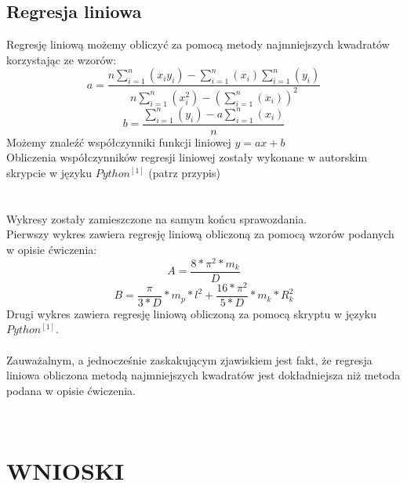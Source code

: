 \documentclass{article}
\begin{document}
{\subsection*{Regresja liniowa}
Regresję liniową możemy obliczyć za pomocą metody najmniejszych kwadratów korzystając ze wzorów:
\[a=\frac{n\sum^n_{i=1}(x_iy_i)-\sum^n_{i=1}(x_i)\sum^n_{i=1}(y_i)}{n\sum^n_{i=1}(x_i^2)-(\sum^n_{i=1}(x_i))^2}\]
\[b = \frac{\sum^n_{i=1}(y_i)-a\sum^n_{i=1}(x_i)}{n}\]
Możemy znaleźć współczynniki funkcji liniowej $y = ax+b$ \\
Obliczenia współczynników regresji liniowej zostały wykonane w autorskim skrypcie w języku $Python^{[1]}$ (patrz przypis) \\
\textbf{} \\
\textbf{} \\
Wykresy zostały zamieszczone na samym końcu sprawozdania.  \\
Pierwszy wykres zawiera regresję liniową obliczoną za pomocą wzorów podanych w opisie ćwiczenia:
\[A = \frac{8*\pi^2*m_k}{D}\]
\[B = \frac{\pi}{3*D}*m_p*l^2+\frac{16*\pi^2}{5*D}*m_k*R_k^2\]
Drugi wykres zawiera regresję liniową obliczoną za pomocą skryptu w języku $Python^{[1]}$. \\
\textbf{} \\
Zauważalnym, a jednocześnie zaskakującym zjawiskiem jest fakt, że regresja liniowa obliczona metodą najmniejszych kwadratów jest dokładniejsza niż metoda podana w opisie ćwiczenia.
}\\





\section*{WNIOSKI}
\end{document}

